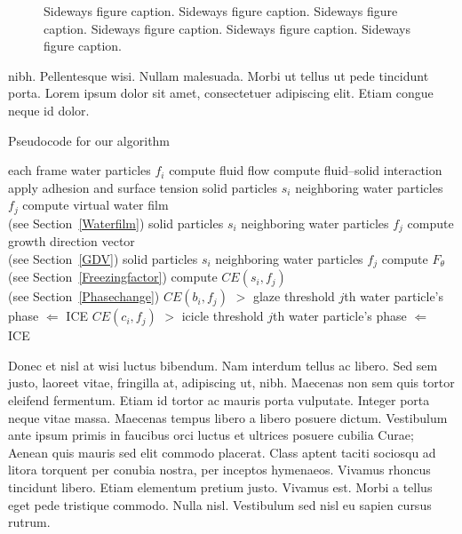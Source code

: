 \documentclass[AMA]{WileyNJD-v1}
\begin{document}
\begin{sidewaysfigure}
\caption{Sideways figure caption. Sideways figure caption. Sideways figure caption. Sideways figure caption. Sideways figure caption. Sideways figure caption.\label{fig3}}
\end{sidewaysfigure}

nibh. Pellentesque wisi.\cite{Kucharik20122851} Nullam malesuada. Morbi ut tellus ut pede tincidunt porta. Lorem ipsum dolor sit amet,
consectetuer adipiscing elit. Etiam congue neque id dolor.

\begin{algorithm}
\caption{Pseudocode for our algorithm}\label{alg1}
\begin{algorithmic}
  \For each frame
  \For water particles $f_{i}$
  \State compute fluid flow\cite{Hirt-Amsden-Cook-74}
  \State compute fluid--solid interaction\cite{Benson-92}
  \State apply adhesion and surface tension\cite{Margolin-Shashkov-remapping-03}
  \EndFor
   \For solid particles $s_{i}$
   \For neighboring water particles $f_{j}$
   \State compute virtual water film \\(see Section~\ref{Waterfilm})
   \EndFor
   \EndFor
   \For solid particles $s_{i}$
   \For neighboring water particles $f_{j}$
   \State compute growth direction vector \\(see Section~\ref{GDV})
   \EndFor
   \EndFor
   \For solid particles $s_{i}$
   \For neighboring water particles $f_{j}$
   \State compute $F_{\theta}$ (see Section~\ref{Freezingfactor})
   \State compute $CE(s_{i},f_{j})$ \\(see Section~\ref{Phasechange})
   \If $CE(b_{i}, f_{j})$ $>$ glaze threshold
   \State $j$th water particle's phase $\Leftarrow$ ICE
   \EndIf
   \If $CE(c_{i}, f_{j})$ $>$ icicle threshold
   \State $j$th water particle's phase $\Leftarrow$ ICE
   \EndIf
   \EndFor
   \EndFor
  \EndFor
\end{algorithmic}
\end{algorithm}

Donec et nisl at wisi luctus bibendum. Nam interdum tellus ac libero. Sed sem justo, laoreet vitae, fringilla at,
adipiscing ut, nibh. Maecenas non sem quis tortor eleifend fermentum. Etiam id tortor ac mauris porta vulputate.
Integer porta neque vitae massa.\cites{Hirt-Amsden-Cook-74,Benson-92}  Maecenas tempus libero a libero posuere dictum. Vestibulum ante ipsum primis in
faucibus orci luctus et ultrices posuere cubilia Curae; Aenean quis mauris sed elit commodo placerat. Class aptent
taciti sociosqu ad litora torquent per conubia nostra, per inceptos hymenaeos. Vivamus rhoncus tincidunt libero.
Etiam elementum pretium justo. Vivamus est. Morbi a tellus eget pede tristique commodo.\cites{Benson-92} Nulla nisl. Vestibulum
sed nisl eu sapien cursus rutrum.
\end{document}
